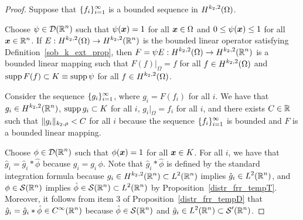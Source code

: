 \begin{proof}
Suppose that $\displaystyle \{f_i\}_{i=1}^\infty$ is a bounded sequence in
$\displaystyle H^{k_2,2}(\Omega)$.

Choose $\displaystyle \psi\in \mathcal{D}(\mathbb{R}^n)$ such that $\psi({\bm{x}})=1$ for all
${\bm{x}}\in \Omega$ and $0\leq \psi({\bm{x}}) \leq 1$ for all
$\displaystyle {\bm{x}}\in \mathbb{R}^n$.  If
$\displaystyle E:H^{k_2,2}(\Omega) \rightarrow H^{k_2,2}(\mathbb{R}^n)$
is the bounded linear operator satisfying
Definition~\ref{sob_k_ext_prop}, then
$\displaystyle F=\psi E:H^{k_2,2}(\Omega) \rightarrow H^{k_2,2}(\mathbb{R}^n)$
is a bounded linear mapping such that $F(f)\big|_{\Omega} = f$ for all
$\displaystyle f\in H^{k_2,2}(\Omega)$ and
$\operatorname{supp} F(f) \subset K \equiv \operatorname{supp} \psi$ for all
$\displaystyle f\in H^{k_2,2}(\Omega)$.

Consider the sequence $\displaystyle \{g_i \}_{i=1}^\infty$, where
$g_i = F(f_i)$ for all $i$.  We have that
$\displaystyle g_i \in H^{k_2,2}(\mathbb{R}^n)$,
$\operatorname{supp} g_i \subset K$ for all $i$, $g_i\big|_{\Omega} = f_i$ for all
$i$, and there exists $C \in \mathbb{R}$ such that
$\displaystyle \|g_i\|_{k_2,\rho} < C$ for
all $i$ because the sequence $\displaystyle \{f_i\}_{i=1}^\infty$ is
bounded and $F$ is a bounded linear mapping.

Choose $\displaystyle \phi \in \mathcal{D}(\mathbb{R}^n)$ such that $\phi({\bm{x}})=1$ for all
${\bm{x}}\in K$.  For all $i$, we have that
$\hat{g}_i = \hat{g}_i \ast \hat{\phi}$
because $g_i = g_i \, \phi$.  Note that $\hat{g}_i \ast \hat{\phi}$ is
defined by the standard integration formula because
$\displaystyle g_i \in H^{k_2,2}(\mathbb{R}^n) \subset L^2(\mathbb{R}^n)$ implies
$\displaystyle \hat{g}_i \in L^2(\mathbb{R}^n)$, and $\phi \in \mathcal{S}(\mathbb{R}^n)$
implies $\displaystyle \hat{\phi} \in \mathcal{S}(\mathbb{R}^n) \subset L^2(\mathbb{R}^n)$
by Proposition~\ref{distr_frr_tempT}.  Moreover, it follows from
item 3 of Proposition~\ref{distr_frr_tempD}
that $\displaystyle \hat{g}_i = \hat{g}_i \ast \hat{\phi} \in C^\infty(\mathbb{R}^n)$
because
$\displaystyle \hat{\phi} \in \mathcal{S}(\mathbb{R}^n)$ and
$\displaystyle \hat{g}_i \in L^2(\mathbb{R}^n) \subset \mathcal{S}'(\mathbb{R}^n)$.


\end{proof}
